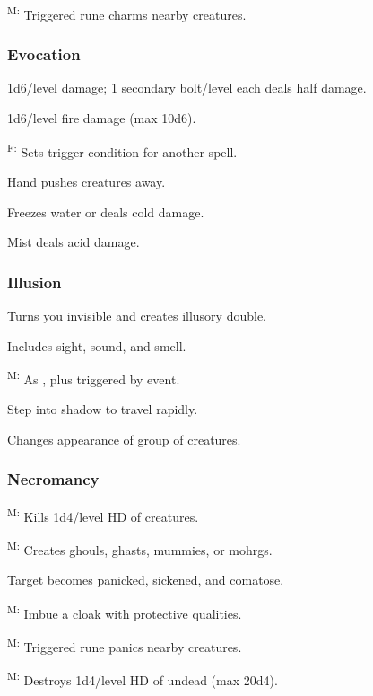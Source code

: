 	\textsuperscript{M:} Triggered rune charms nearby creatures.

\subsubsection{Evocation}
	 1d6/level damage; 1 secondary bolt/level each deals half damage.

	 1d6/level fire damage (max 10d6). %

	\textsuperscript{F:} Sets trigger condition for another spell.

	 Hand pushes creatures away.

	 Freezes water or deals cold damage.

	 Mist deals acid damage. %

\subsubsection{Illusion}
	 Turns you invisible and creates illusory double.

	 Includes sight, sound, and smell.

	\textsuperscript{M:} As , plus triggered by event.

	 Step into shadow to travel rapidly.

	 Changes appearance of group of creatures.

\subsubsection{Necromancy}
	\textsuperscript{M:} Kills 1d4/level HD of creatures.

	\textsuperscript{M:} Creates ghouls, ghasts, mummies, or mohrgs.

	 Target becomes panicked, sickened, and comatose.

	\textsuperscript{M:} Imbue a cloak with protective qualities. %

	\textsuperscript{M:} Triggered rune panics nearby creatures.

	\textsuperscript{M:} Destroys 1d4/level HD of undead (max 20d4).

